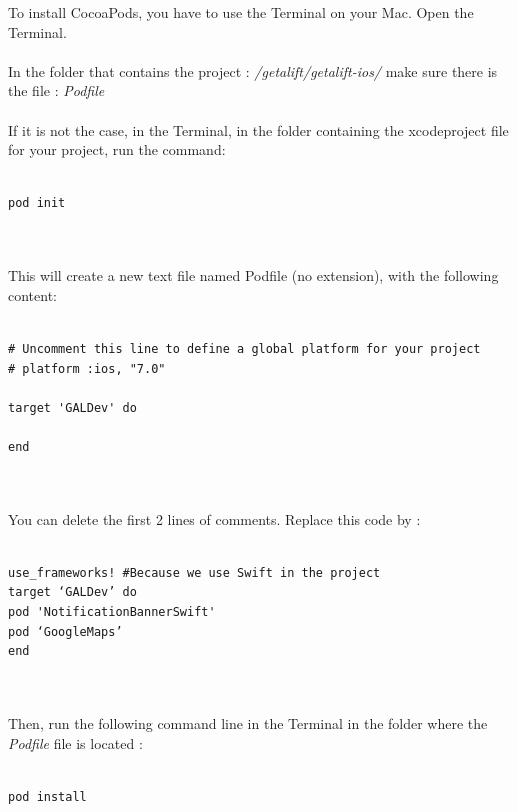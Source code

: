 To install CocoaPods, you have to use the Terminal on your Mac. Open the Terminal.
\\\\
In the folder that contains the project : \textit{/getalift/getalift-ios/} make sure there is the file : \textit{Podfile}
\\\\
If it is not the case, in the Terminal, in the folder containing the xcodeproject file for your project, run the command:
\\\\
\begin{DDbox}{\linewidth}
\begin{verbatim}
pod init
\end{verbatim}
\end{DDbox}
\\\\
This will create a new text file named Podfile (no extension), with the following content:
\\\\
\begin{DDbox}{\linewidth}
\begin{verbatim}
# Uncomment this line to define a global platform for your project
# platform :ios, "7.0"

target 'GALDev' do

end
\end{verbatim}
\end{DDbox}
\\\\
You can delete the first 2 lines of comments. Replace this code by :
\\\\
\begin{DDbox}{\linewidth}
\begin{verbatim}
use_frameworks! #Because we use Swift in the project
target ‘GALDev’ do 
pod 'NotificationBannerSwift'
pod ‘GoogleMaps’
end
\end{verbatim}
\end{DDbox}
\\\\
Then, run the following command line in the Terminal in the folder where the \textit{Podfile} file is located :
\\\\
\begin{DDbox}{\linewidth}
\begin{verbatim}
pod install
\end{verbatim}
\end{DDbox}
\clearpage

